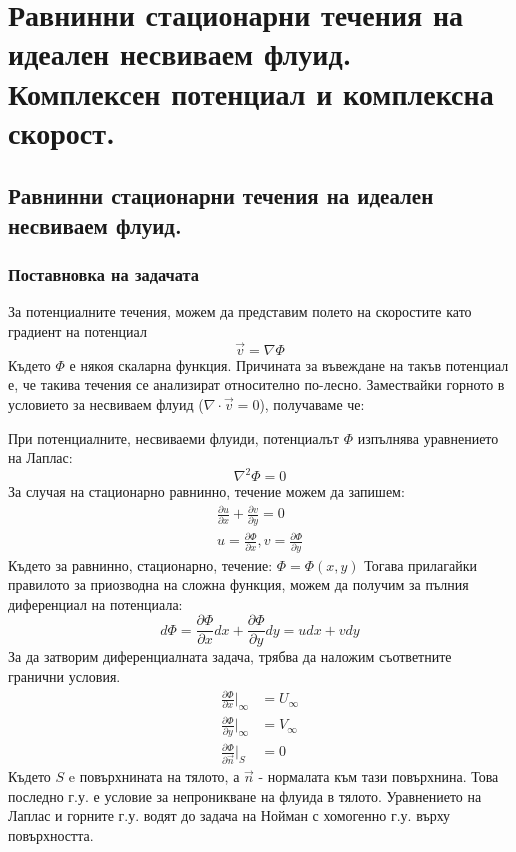 \section{Равнинни стационарни течения на идеален несвиваем флуид. Комплексен потенциал и комплексна скорост.}
\subsection{Равнинни стационарни течения на идеален несвиваем флуид.}
\subsubsection{Поставновка на задачата}
За потенциалните течения, можем да представим полето на скоростите като градиент на потенциал
\begin{equation*}
    \vec{v} = \nabla \Phi
\end{equation*}
Където $\Phi$ е някоя скаларна функция. Причината за въвеждане на такъв потенциал е, че такива течения се анализират относително по-лесно. Замествайки горното в условието за несвиваем флуид ($\nabla \cdot \vec{v} = 0$), получаваме че:

\noindent При потенциалните, несвиваеми флуиди, потенциалът $\Phi$ изпълнява уравнението на Лаплас:
\begin{equation*}
	\nabla^2 \Phi  = 0
\end{equation*}
За случая на стационарно равнинно, течение можем да запишем:
\begin{align}
    \label{eq:planar_flow}
	\frac{\partial u}{\partial x} + \frac{\partial v}{\partial y} = 0 \\
	u = \frac{\partial \Phi}{\partial x}, v = \frac{\partial \Phi}{\partial y}
\end{align}
Където за равнинно, стационарно, течение: $\Phi = \Phi(x,y)$
Тогава прилагайки правилото за приозводна на сложна функция, можем да получим за пълния диференциал на потенциала:
\begin{equation*}
	d \Phi = \frac{\partial \Phi}{\partial x} d x +  \frac{\partial \Phi}{\partial y} dy = u dx + v dy
\end{equation*}
За да затворим диференциалната задача, трябва да наложим съответните гранични условия.
\begin{align*}
	\frac{\partial \Phi}{\partial x} \Bigg|_{\infty} & = U_{\infty} \\
	\frac{\partial \Phi}{\partial y} \Bigg|_{\infty} & = V_{\infty} \\
	\frac{\partial \Phi}{\partial \vec{n}} \Bigg|_{S}      & = 0
\end{align*}
Където $S$ e повърхнината на тялото, а $\vec{n}$ - нормалата към тази повърхнина. Това последно г.у. е условие за непроникване на 
флуида в тялото.
Уравнението на Лаплас и горните г.у. водят до задача на Нойман с хомогенно г.у. върху повърхността.
